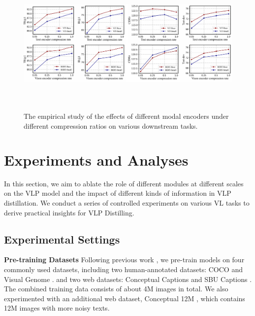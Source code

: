 \documentclass[10pt,twocolumn,letterpaper]{article}
\begin{document}
\begin{figure}[t]
      \begin{center}
      \centerline{\includegraphics[width=175mm,height=64mm]{imgs/model_ablation.pdf}}
      \caption{
       The empirical study of the effects of different modal encoders under different compression ratios on various downstream tasks. }
      \vspace{-2.em}
      \label{model_size}
      \end{center}
      \vskip -0.1in
  \end{figure}


\section{Experiments and Analyses}
In this section, we aim to ablate the role of different modules at different scales on the VLP model and the impact of different kinds of information in VLP distillation.
We conduct a series of controlled experiments on various VL tasks to derive practical insights for VLP Distilling.

\subsection{Experimental Settings}

\vspace{0.4em}
\par
\noindent
\textbf{Pre-training Datasets}
Following previous work \cite{li2021align,dou2022empirical}, we pre-train models on four commonly used datasets, including two human-annotated datasets: COCO \cite{lin2014microsoft} and Visual Genome \cite{krishna2017visual}. and two web datasets: Conceptual Captions \cite{sharma2018conceptual} and SBU Captions \cite{ordonez2011im2text}. 
The combined training data consists of about 4M images in total. 
We also experimented with an additional web dataset, Conceptual 12M \cite{changpinyo2021conceptual}, which contains 12M images with more noisy texts. 
\end{document}
